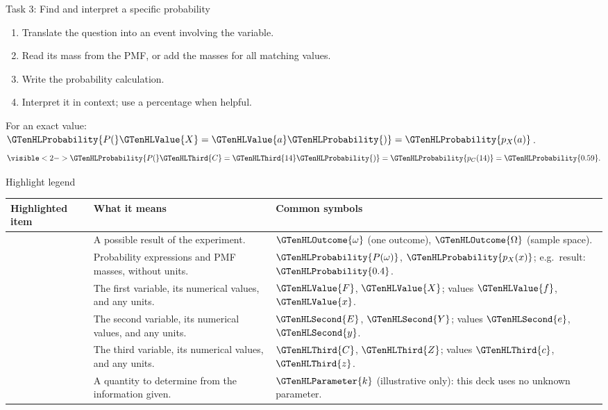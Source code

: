 \documentclass[12pt,aspectratio=169]{beamer}
\makeatletter
\renewcommand{\arraystretch}{1.22}
\newcommand{\LessonHighlightLegend}{%
  \begingroup
  \small
  \setlength{\tabcolsep}{4pt}
  \renewcommand{\arraystretch}{1.0}
  \begin{tabularx}{\linewidth}{@{}>{\raggedright\arraybackslash}p{.255\linewidth}%
    >{\raggedright\arraybackslash}X>{\raggedright\arraybackslash}p{.34\linewidth}@{}}
    \toprule
    \textbf{Highlighted item} & \textbf{What it means} & \textbf{Common symbols} \\
    \midrule
    \GTenHLOutcome{Outcome} & A possible result of the experiment. &
      $\GTenHLOutcome{\omega}$ (one outcome),\newline
      $\GTenHLOutcome{\Omega}$ (sample space). \\
    \GTenHLProbability{Probability} & Probability expressions and PMF masses, without units. &
      $\GTenHLProbability{P(\omega)}$, $\GTenHLProbability{p_X(x)}$;\newline
      e.g.\ result: $\GTenHLProbability{0.4}$. \\
    \GTenHLValue{First variable} & The first variable, its numerical values, and any units. &
      $\GTenHLValue{F}$, $\GTenHLValue{X}$; values $\GTenHLValue{f}$, $\GTenHLValue{x}$. \\
    \GTenHLSecond{Second variable} & The second variable, its numerical values, and any units. &
      $\GTenHLSecond{E}$, $\GTenHLSecond{Y}$; values $\GTenHLSecond{e}$, $\GTenHLSecond{y}$. \\
    \GTenHLThird{Third variable} & The third variable, its numerical values, and any units. &
      $\GTenHLThird{C}$, $\GTenHLThird{Z}$; values $\GTenHLThird{c}$, $\GTenHLThird{z}$. \\
    \GTenHLParameter{Unknown parameter} & A quantity to determine from the information given. &
      $\GTenHLParameter{k}$ (illustrative only): this deck uses no unknown parameter. \\
    \bottomrule
  \end{tabularx}\par
  \endgroup
}
\makeatother
\begin{document}
\begin{frame}[t]{Task 3: Find and interpret a specific probability}
  \begin{enumerate}
    \item Translate the question into an event involving the variable.
    \item Read its mass from the PMF, or add the masses for all matching values.
    \item Write the probability calculation.
    \item Interpret it in context; use a percentage when helpful.
  \end{enumerate}
  For an exact value: $\GTenHLProbability{P(}\GTenHLValue{X}=\GTenHLValue{a}\GTenHLProbability{)}=\GTenHLProbability{p_X(a)}$.
  \[
    \visible<2->{\GTenHLProbability{P(}\GTenHLThird{C}=\GTenHLThird{14}\GTenHLProbability{)}
      =\GTenHLProbability{p_C(14)}=\GTenHLProbability{0.59}.}
  \]

  \medskip
\end{frame}

\begin{frame}[t]{Highlight legend}
  \LessonHighlightLegend
\end{frame}
\end{document}
